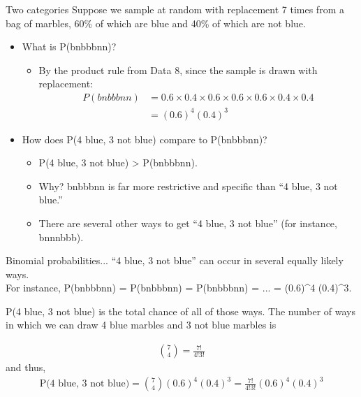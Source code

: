 \documentclass[aspectratio=169]{../latex_main/tntbeamer}  %
\begin{document}
	
	\begin{frame}{Two categories}
	Suppose we sample at random with replacement 7 times from a bag of marbles, 60\% of which are blue and 40\% of which are not blue.

	\begin{itemize}
	    \item What is P(bnbbbnn)?
	    \begin{itemize}
	        \item By the product rule from Data 8, since the sample is drawn with replacement:
            \begin{align*}
                P(bnbbbnn) &= 0.6 \times 0.4 \times 0.6 \times 0.6 \times 0.6 \times 0.4 \times 0.4 \\
                &= (0.6)^4 (0.4)^3
            \end{align*}
	    \end{itemize}
	    \item How does P(4 blue, 3 not blue) compare to P(bnbbbnn)?
	    \begin{itemize}
	        \item P(4 blue, 3 not blue) > P(bnbbbnn).
	        \item Why? bnbbbnn is far more restrictive and specific than “4 blue, 3 not blue.”
	        \item There are several other ways to get “4 blue, 3 not blue” (for instance, bnnnbbb).
	    \end{itemize}
	\end{itemize}

	\end{frame}
	
	
		\begin{frame}{Binomial probabilities...}
	“4 blue, 3 not blue” can occur in several equally likely ways.\\                     For instance, P(bnbbbnn) = P(bnbbbnn) = P(bnbbbnn) = ... = (0.6)^4 (0.4)^3. \\         \bigskip
	    
	    P(4 blue, 3 not blue) is the total chance of all of those ways. The number of ways in which we can draw 4 blue marbles and 3 not blue marbles is

        \begin{align*}
            \binom{7}{4} = \frac{7!}{4!3!}
        \end{align*}
    and thus,
    \begin{align*}
        \text{P(4 blue, 3 not blue)} = \binom{7}{4}(0.6)^4 (0.4)^3 = \frac{7!}{4!3!}(0.6)^4 (0.4)^3
    \end{align*}

	\end{frame}
	
\end{document}
